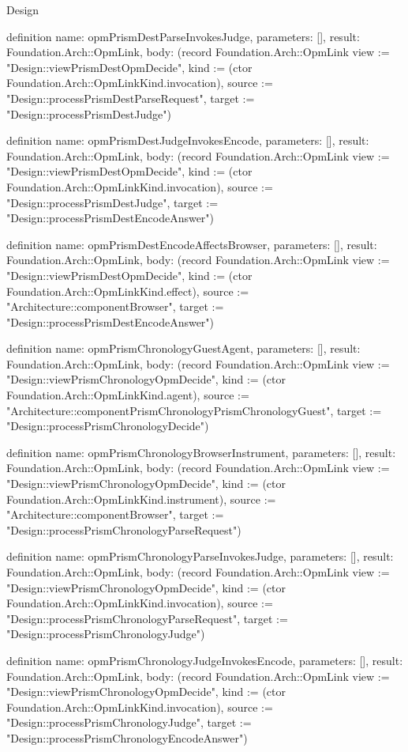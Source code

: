\begin{lexlean}{Design}
\begin{semanticmodule}
definition{
  name: opmPrismDestParseInvokesJudge,
  parameters: [],
  result: Foundation.Arch::OpmLink,
  body: (record Foundation.Arch::OpmLink {view := "Design::viewPrismDestOpmDecide", kind := (ctor Foundation.Arch::OpmLinkKind.invocation), source := "Design::processPrismDestParseRequest", target := "Design::processPrismDestJudge"})
}

definition{
  name: opmPrismDestJudgeInvokesEncode,
  parameters: [],
  result: Foundation.Arch::OpmLink,
  body: (record Foundation.Arch::OpmLink {view := "Design::viewPrismDestOpmDecide", kind := (ctor Foundation.Arch::OpmLinkKind.invocation), source := "Design::processPrismDestJudge", target := "Design::processPrismDestEncodeAnswer"})
}

definition{
  name: opmPrismDestEncodeAffectsBrowser,
  parameters: [],
  result: Foundation.Arch::OpmLink,
  body: (record Foundation.Arch::OpmLink {view := "Design::viewPrismDestOpmDecide", kind := (ctor Foundation.Arch::OpmLinkKind.effect), source := "Architecture::componentBrowser", target := "Design::processPrismDestEncodeAnswer"})
}

definition{
  name: opmPrismChronologyGuestAgent,
  parameters: [],
  result: Foundation.Arch::OpmLink,
  body: (record Foundation.Arch::OpmLink {view := "Design::viewPrismChronologyOpmDecide", kind := (ctor Foundation.Arch::OpmLinkKind.agent), source := "Architecture::componentPrismChronologyPrismChronologyGuest", target := "Design::processPrismChronologyDecide"})
}

definition{
  name: opmPrismChronologyBrowserInstrument,
  parameters: [],
  result: Foundation.Arch::OpmLink,
  body: (record Foundation.Arch::OpmLink {view := "Design::viewPrismChronologyOpmDecide", kind := (ctor Foundation.Arch::OpmLinkKind.instrument), source := "Architecture::componentBrowser", target := "Design::processPrismChronologyParseRequest"})
}

definition{
  name: opmPrismChronologyParseInvokesJudge,
  parameters: [],
  result: Foundation.Arch::OpmLink,
  body: (record Foundation.Arch::OpmLink {view := "Design::viewPrismChronologyOpmDecide", kind := (ctor Foundation.Arch::OpmLinkKind.invocation), source := "Design::processPrismChronologyParseRequest", target := "Design::processPrismChronologyJudge"})
}

definition{
  name: opmPrismChronologyJudgeInvokesEncode,
  parameters: [],
  result: Foundation.Arch::OpmLink,
  body: (record Foundation.Arch::OpmLink {view := "Design::viewPrismChronologyOpmDecide", kind := (ctor Foundation.Arch::OpmLinkKind.invocation), source := "Design::processPrismChronologyJudge", target := "Design::processPrismChronologyEncodeAnswer"})
}


\end{semanticmodule}
\end{lexlean}
